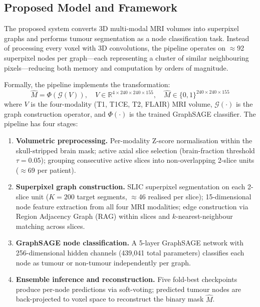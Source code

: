 \documentclass{article}
\begin{document}
\subsection{Proposed Model and Framework}
\label{sec:framework}

The proposed system converts 3D multi-modal MRI volumes into superpixel
graphs and performs tumour segmentation as a node classification task.
Instead of processing every voxel with 3D convolutions, the pipeline
operates on $\approx$92 superpixel nodes per graph---each representing a
cluster of similar neighbouring pixels---reducing both memory and
computation by orders of magnitude.

Formally, the pipeline implements the transformation:
\[
    \hat{M} = \Phi\!\left(\mathcal{G}(V)\right),
    \quad V \in \mathbb{R}^{4 \times 240 \times 240 \times 155},
    \quad \hat{M} \in \{0,1\}^{240 \times 240 \times 155}
\]
where $V$ is the four-modality (T1, T1CE, T2, FLAIR) MRI volume,
$\mathcal{G}(\cdot)$ is the graph construction operator, and
$\Phi(\cdot)$ is the trained GraphSAGE classifier. The pipeline has four
stages:

\begin{enumerate}
    \item \textbf{Volumetric preprocessing.} Per-modality Z-score
    normalisation within the skull-stripped brain mask; active axial slice
    selection (brain-fraction threshold $\tau = 0.05$); grouping
    consecutive active slices into non-overlapping 2-slice units
    ($\approx$69 per patient).

    \item \textbf{Superpixel graph construction.} SLIC
    \cite{achanta2012slic} superpixel segmentation on each 2-slice unit
    ($K = 200$ target segments, $\approx$46 realised per slice);
    15-dimensional node feature extraction from all four MRI modalities;
    edge construction via Region Adjacency Graph (RAG) within slices and
    $k$-nearest-neighbour matching across slices.

    \item \textbf{GraphSAGE node classification.} A 5-layer GraphSAGE
    \cite{hamilton2017graphsage} network with 256-dimensional hidden
    channels (439,041 total parameters) classifies each node as tumour
    or non-tumour independently per graph.

    \item \textbf{Ensemble inference and reconstruction.} Five fold-best
    checkpoints produce per-node predictions via soft-voting; predicted
    tumour nodes are back-projected to voxel space to reconstruct the
    binary mask $\hat{M}$.
\end{enumerate}
\end{document}

